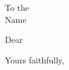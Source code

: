 \documentclass[10pt]{brownletter}
\date{\today}
\begin{document}
\begin{letter}{
To the\\
Name
}

\opening{Dear}

\closing{Yours faithfully,}

\end{letter}
\end{document}
